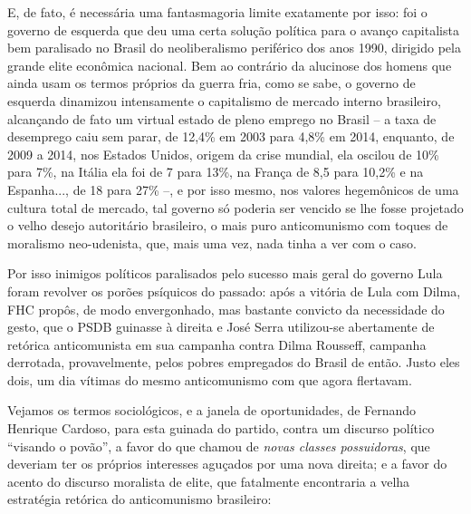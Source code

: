 E, de fato, é necessária uma fantasmagoria limite exatamente por isso:
foi o governo de esquerda que deu uma certa solução política para o
avanço capitalista bem paralisado no Brasil do neoliberalismo periférico
dos anos 1990, dirigido pela grande elite econômica nacional. Bem ao
contrário da alucinose dos homens que ainda usam os termos próprios da
guerra fria, como se sabe, o governo de esquerda dinamizou intensamente
o capitalismo de mercado interno brasileiro, alcançando de fato um
virtual estado de pleno emprego no Brasil -- a taxa de desemprego caiu
sem parar, de 12,4\% em 2003 para 4,8\% em 2014, enquanto, de 2009 a
2014, nos Estados Unidos, origem da crise mundial, ela oscilou de 10\%
para 7\%, na Itália ela foi de 7 para 13\%, na França de 8,5 para 10,2\%
e na Espanha..., de 18 para 27\% --, e por isso mesmo, nos valores
hegemônicos de uma cultura total de mercado, tal governo só poderia ser
vencido se lhe fosse projetado o velho desejo autoritário brasileiro, o
mais puro anticomunismo com toques de moralismo neo-udenista, que, mais
uma vez, nada tinha a ver com o caso.

Por isso inimigos políticos paralisados pelo sucesso mais geral do
governo Lula foram revolver os porões psíquicos do passado: após a
vitória de Lula com Dilma, FHC propôs, de modo envergonhado, mas
bastante convicto da necessidade do gesto, que o PSDB guinasse à direita
e José Serra utilizou-se abertamente de retórica anticomunista em sua
campanha contra Dilma Rousseff, campanha derrotada, provavelmente, pelos
pobres empregados do Brasil de então. Justo eles dois, um dia vítimas do
mesmo anticomunismo com que agora flertavam.

Vejamos os termos sociológicos, e a janela de oportunidades, de Fernando
Henrique Cardoso, para esta guinada do partido, contra um discurso
político ``visando o povão'', a favor do que chamou de \emph{novas
classes possuidoras}, que deveriam ter os próprios interesses aguçados
por uma nova direita; e a favor do acento do discurso moralista de
elite, que fatalmente encontraria a velha estratégia retórica do
anticomunismo brasileiro:

